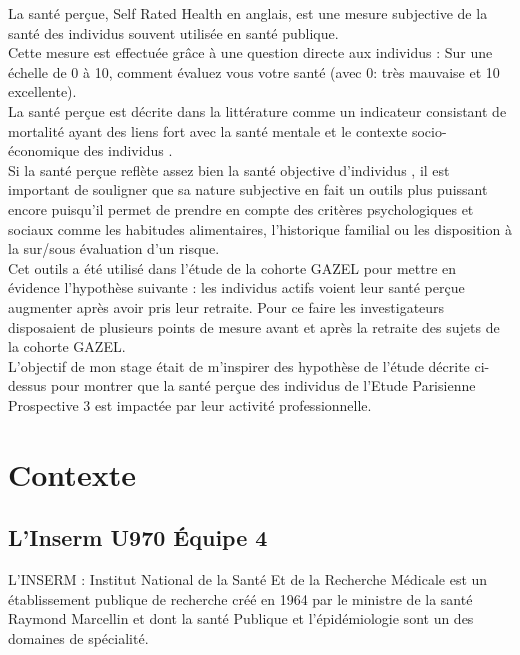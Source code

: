 \documentclass{book}
\begin{document}
\noindent
La santé perçue, Self Rated Health en anglais, est une mesure subjective de la santé des individus souvent utilisée en santé publique.\\
Cette mesure est effectuée grâce à une question directe aux individus : Sur une échelle de 0 à 10, comment évaluez vous votre santé (avec 0: très mauvaise et 10 excellente).\\
La santé perçue est décrite dans la littérature comme un indicateur consistant de mortalité\cite{mossey_self-rated_1982} \cite{crossley_reliability_2002} ayant des liens fort avec la santé mentale \cite{millan-calenti_depressive_2012} et le contexte socio-économique des individus  \cite{mansyur_social_2008} \cite{alvarez-galvez_impact_2013}.\\
Si la santé perçue reflète assez bien la santé objective d'individus \cite{wu_relationship_2013} , il est important de souligner que sa nature subjective en fait un outils plus puissant encore puisqu'il permet de prendre en compte des critères psychologiques et sociaux comme les habitudes alimentaires, l'historique familial ou les disposition à la sur/sous évaluation d'un risque.\\

\noindent
Cet outils a été utilisé dans l'étude de la cohorte GAZEL pour mettre en évidence l'hypothèse suivante\cite{westerlund_self-rated_2009}  : les individus actifs voient leur santé perçue augmenter après avoir pris leur retraite. Pour ce faire les investigateurs disposaient de plusieurs points de mesure avant et après la retraite des sujets de la cohorte GAZEL.\\

\noindent
L'objectif de mon stage était de m'inspirer des hypothèse de l'étude décrite ci-dessus pour montrer que la santé perçue des individus de l'Etude Parisienne Prospective 3 \cite{empana_paris_2011} est impactée par leur activité professionnelle.\\



\newpage
\section{Contexte}
\subsection{L'Inserm U970 Équipe 4}

\noindent
L'INSERM : Institut National de la Santé Et de la Recherche Médicale est un établissement publique de recherche créé en 1964 par le ministre de la santé Raymond Marcellin et dont la santé Publique et l'épidémiologie sont un des domaines de spécialité.\\
\end{document}
